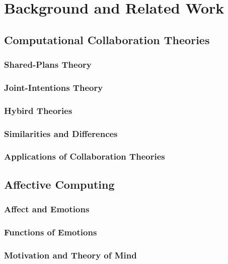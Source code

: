 \documentclass[12pt]{report}
\begin{document}
\chapter{Background and Related Work}
\label{ch:background}

\section{Computational Collaboration Theories}

\subsection{Shared-Plans Theory}

\subsection{Joint-Intentions Theory}

\subsection{Hybird Theories}

\subsection{Similarities and Differences}

\subsection{Applications of Collaboration Theories}

\section{Affective Computing}

\subsection{Affect and Emotions}

\subsection{Functions of Emotions}

\subsection{Motivation and Theory of Mind}
\end{document}

